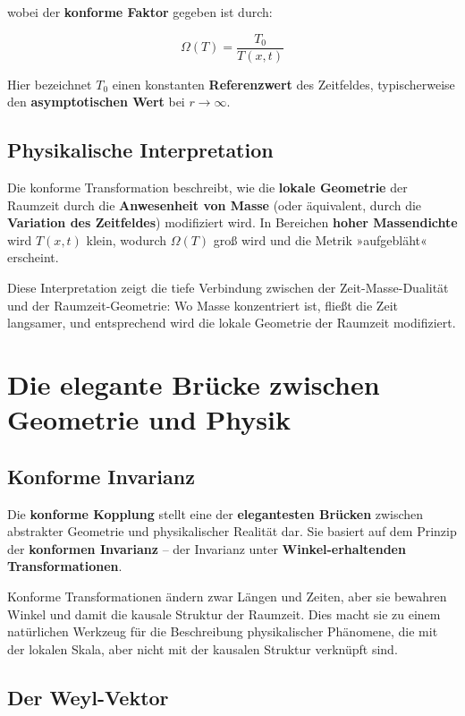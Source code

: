 \documentclass[12pt,a4paper]{report}
\begin{document}
wobei der \textbf{konforme Faktor} gegeben ist durch:

\begin{equation}
	\Omega(T) = \frac{T_0}{T(x,t)}
\end{equation}

Hier bezeichnet $T_0$ einen konstanten \textbf{Referenzwert} des Zeitfeldes, typischerweise den \textbf{asymptotischen Wert} bei $r \to \infty$.

\subsection{Physikalische Interpretation}

Die konforme Transformation beschreibt, wie die \textbf{lokale Geometrie} der Raumzeit durch die \textbf{Anwesenheit von Masse} (oder äquivalent, durch die \textbf{Variation des Zeitfeldes}) modifiziert wird. In Bereichen \textbf{hoher Massendichte} wird $T(x,t)$ klein, wodurch $\Omega(T)$ groß wird und die Metrik »aufgebläht« erscheint.

Diese Interpretation zeigt die tiefe Verbindung zwischen der Zeit-Masse-Dualität und der Raumzeit-Geometrie: Wo Masse konzentriert ist, fließt die Zeit langsamer, und entsprechend wird die lokale Geometrie der Raumzeit modifiziert.

\section{Die elegante Brücke zwischen Geometrie und Physik}

\subsection{Konforme Invarianz}

Die \textbf{konforme Kopplung} stellt eine der \textbf{elegantesten Brücken} zwischen abstrakter Geometrie und physikalischer Realität dar. Sie basiert auf dem Prinzip der \textbf{konformen Invarianz} -- der Invarianz unter \textbf{Winkel-erhaltenden Transformationen}.

Konforme Transformationen ändern zwar Längen und Zeiten, aber sie bewahren Winkel und damit die kausale Struktur der Raumzeit. Dies macht sie zu einem natürlichen Werkzeug für die Beschreibung physikalischer Phänomene, die mit der lokalen Skala, aber nicht mit der kausalen Struktur verknüpft sind.

\subsection{Der Weyl-Vektor}
\end{document}
